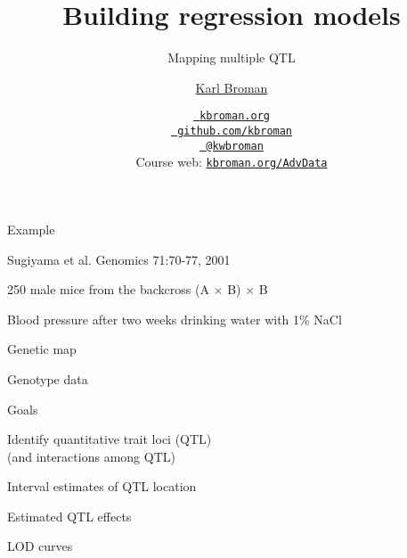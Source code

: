 \documentclass[aspectratio=169,12pt,t]{beamer}
\title{Building regression models}
\subtitle{Mapping multiple QTL}
\author{\href{https://kbroman.org}{Karl Broman}}
\institute{Biostatistics \& Medical Informatics, UW{\textendash}Madison}
\date{\href{https://kbroman.org}{\tt \scriptsize \color{foreground} kbroman.org}
\\[-4pt]
\href{https://github.com/kbroman}{\tt \scriptsize \color{foreground} github.com/kbroman}
\\[-4pt]
\href{https://twitter.com/kwbroman}{\tt \scriptsize \color{foreground} @kwbroman}
\\[-4pt]
{\scriptsize Course web: \href{https://kbroman.org/AdvData}{\tt kbroman.org/AdvData}}
}
\begin{document}
{
 }







\begin{frame}{Example}

\footnotesize
Sugiyama et al. Genomics 71:70-77, 2001

\bi
\item 250 male mice from the backcross (A $\times$ B) $\times$ B
\item Blood pressure after two weeks drinking water with 1\% NaCl
\ei


\end{frame}







\begin{frame}[c]{Genetic map}


\end{frame}





\begin{frame}[c]{Genotype data}


\end{frame}





\begin{frame}[c]{Goals}

\bbi
\item Identify quantitative trait loci (QTL) \\[6pt]
   {\lolit   (and interactions among QTL)}
\item Interval estimates of QTL location
\item Estimated QTL effects
\ei

\end{frame}




\begin{frame}[c]{LOD curves}


\end{frame}
\end{document}
